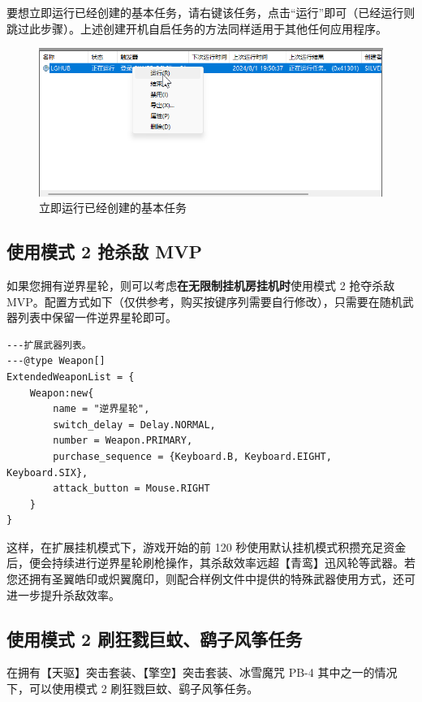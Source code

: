 要想立即运行已经创建的基本任务，请右键该任务，点击“运行”即可（已经运行则跳过此步骤）。上述创建开机自启任务的方法同样适用于其他任何应用程序。

\begin{figure}[H]
    \Centering
    \includegraphics[width=\textwidth]{docs/assets/skills/run_task.png}
    \caption{立即运行已经创建的基本任务}
\end{figure}


\subsection{使用模式 2 抢杀敌 MVP}
\label{subsection-mode-2-skill-0}

如果您拥有逆界星轮，则可以考虑\textbf{在无限制挂机房挂机时}使用模式 2 抢夺杀敌 MVP。配置方式如下（仅供参考，购买按键序列需要自行修改），只需要在随机武器列表中保留一件逆界星轮即可。

\begin{verbatim}
---扩展武器列表。
---@type Weapon[]
ExtendedWeaponList = {
    Weapon:new{
        name = "逆界星轮",
        switch_delay = Delay.NORMAL,
        number = Weapon.PRIMARY,
        purchase_sequence = {Keyboard.B, Keyboard.EIGHT, Keyboard.SIX},
        attack_button = Mouse.RIGHT
    }
}
\end{verbatim}

这样，在扩展挂机模式下，游戏开始的前 120 秒使用默认挂机模式积攒充足资金后，便会持续进行逆界星轮刷枪操作，其杀敌效率远超【青鸾】迅风轮等武器。若您还拥有圣翼皓印或炽翼魔印，则配合样例文件中提供的特殊武器使用方式，还可进一步提升杀敌效率。

\subsection{使用模式 2 刷狂戮巨蚊、鹞子风筝任务}
\label{subsection-mode-2-skill-1}

在拥有【天驱】突击套装、【擎空】突击套装、冰雪魔咒 PB-4 其中之一的情况下，可以使用模式 2 刷狂戮巨蚊、鹞子风筝任务。

